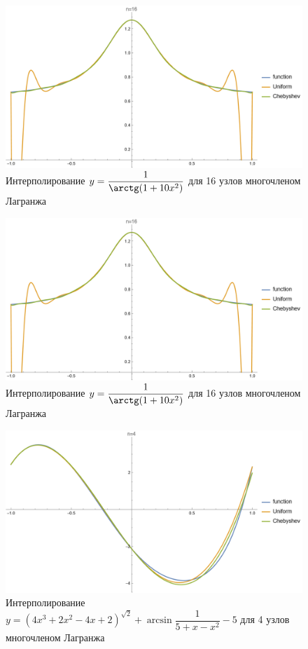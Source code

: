 \documentclass{article}
\begin{document}
    \begin{figure}[H]
        \includegraphics[width=\textwidth]{atan16.png}
        \caption{Интерполирование $y = \dfrac{1}{\arctg (1+10x^2)}$ для 16 узлов многочленом Лагранжа}
    \end{figure}
    \begin{figure}[H]
        \includegraphics[width=\textwidth]{atan16.png}
        \caption{Интерполирование $y = \dfrac{1}{\arctg (1+10x^2)}$ для 16 узлов многочленом Лагранжа}
    \end{figure}
    \begin{figure}[H]
        \includegraphics[width=\textwidth]{test4.png}
        \caption{Интерполирование $y = (4x^3 + 2x^2 - 4x + 2 )^{\sqrt{2}} + \arcsin{\dfrac{1}{5+x - x^2}} - 5$ для 4 узлов многочленом Лагранжа}
    \end{figure}
\end{document}
